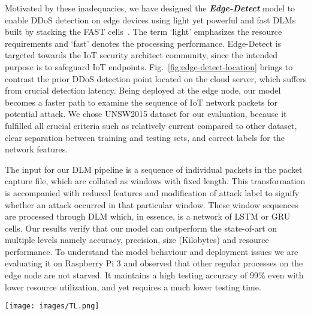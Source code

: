 \documentclass[conference]{IEEEtran}
\begin{document}
Motivated by these inadequacies, we have designed the \textbf{\textit{Edge-Detect}} model to enable DDoS detection on edge devices using light yet powerful and fast DLMs built by stacking the FAST cells~\cite{kusupati2018fastgrnn}. The term `light' emphasizes the resource requirements and `fast' denotes the processing performance. Edge-Detect is targeted towards the IoT security architect community, since the intended purpose is to safeguard IoT endpoints. Fig.~\ref{fig:edge-detect-location} brings to contrast the prior DDoS detection point located on the cloud server, which suffers from crucial detection latency. Being deployed at the edge node, our model becomes a faster path to examine the sequence of IoT network packets for potential attack. We chose UNSW2015 \cite{moustafa2015unsw} dataset for our evaluation, because it fulfilled all crucial criteria such as relatively current compared to other dataset, clear separation between training and testing sets, and correct labels for the network features.

The input for our DLM pipeline is a sequence of individual packets in the packet capture file, which are collated as windows with fixed length. This transformation is accompanied with reduced features and modification of attack label to signify whether an attack occurred in that particular window. 
These window sequences are processed through DLM which, in essence, is a network of LSTM or GRU cells. 
Our results verify that our model can outperform the state-of-art on multiple levels namely accuracy, precision, size (Kilobytes) and resource performance. To understand the model behaviour and deployment issues we are evaluating it on Raspberry Pi 3 and observed that other regular processes on the edge node are not starved.      
It maintains a high testing accuracy of 99\% even with lower resource utilization, and yet requires a much lower testing time.

\begin{figure*}
   \centering
\texttt{[image: images/TL.png]}
\caption{Proposed location of Edge-Detect in comparison to the previous detection point in the cloud side. Transferring data from the point of attack up the hierarchy to cloud server causes crucial detection delays. Edge-Detect model (blue box) represents the edge node with added capabilities of our light and fast recurring neural network (RNN) module. The packet capture files from the IoT endpoints become the input, which are parsed and analyzed for detection purposes. This detection results can help drive the recommendation module for corrective actions.}
  \label{fig:edge-detect-location}
\end{figure*}
\end{document}
